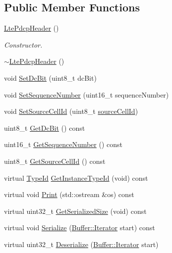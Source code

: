 \subsection*{Public Member Functions}
\begin{DoxyCompactItemize}
\item 
\hyperlink{classns3_1_1LtePdcpHeader_a5e245e5fd526b1b81a7f53282d453836}{Lte\+Pdcp\+Header} ()
\begin{DoxyCompactList}\small\item\em Constructor. \end{DoxyCompactList}\item 
\hyperlink{classns3_1_1LtePdcpHeader_aa8d4b5837e9fb9ce6cf1fa9adcd8b665}{$\sim$\+Lte\+Pdcp\+Header} ()
\item 
void \hyperlink{classns3_1_1LtePdcpHeader_a086207dfae8bce9458e84f4c4516287d}{Set\+Dc\+Bit} (uint8\+\_\+t dc\+Bit)
\item 
void \hyperlink{classns3_1_1LtePdcpHeader_a67b27204cdecd27cf8c6fb894e59b121}{Set\+Sequence\+Number} (uint16\+\_\+t sequence\+Number)
\item 
void \hyperlink{classns3_1_1LtePdcpHeader_ad20d3761a7e03df91ab663a097609f89}{Set\+Source\+Cell\+Id} (uint8\+\_\+t \hyperlink{classns3_1_1LtePdcpHeader_a1a3e927f8d1a684a1453de72724ccf99}{source\+Cell\+Id})
\item 
uint8\+\_\+t \hyperlink{classns3_1_1LtePdcpHeader_aebf21704450f11d419fa1fc99880c7df}{Get\+Dc\+Bit} () const 
\item 
uint16\+\_\+t \hyperlink{classns3_1_1LtePdcpHeader_a3c4043f847f07607a1a0d26c16b3f12c}{Get\+Sequence\+Number} () const 
\item 
uint8\+\_\+t \hyperlink{classns3_1_1LtePdcpHeader_a7c6ad89325b16daf70b20703e84b0434}{Get\+Source\+Cell\+Id} () const 
\item 
virtual \hyperlink{classns3_1_1TypeId}{Type\+Id} \hyperlink{classns3_1_1LtePdcpHeader_a825afcbd6686a9ef63f7f45e69411e4c}{Get\+Instance\+Type\+Id} (void) const 
\item 
virtual void \hyperlink{classns3_1_1LtePdcpHeader_a557767becacb748a95ffb4b6ec5508f1}{Print} (std\+::ostream \&os) const 
\item 
virtual uint32\+\_\+t \hyperlink{classns3_1_1LtePdcpHeader_a5282ab518b7bfd566f681ebb5a04b264}{Get\+Serialized\+Size} (void) const 
\item 
virtual void \hyperlink{classns3_1_1LtePdcpHeader_ac080ef3911d35c7bd445e91d951ba307}{Serialize} (\hyperlink{classns3_1_1Buffer_1_1Iterator}{Buffer\+::\+Iterator} start) const 
\item 
virtual uint32\+\_\+t \hyperlink{classns3_1_1LtePdcpHeader_a575d529e9229a6fc54227a01598b5661}{Deserialize} (\hyperlink{classns3_1_1Buffer_1_1Iterator}{Buffer\+::\+Iterator} start)
\end{DoxyCompactItemize}
